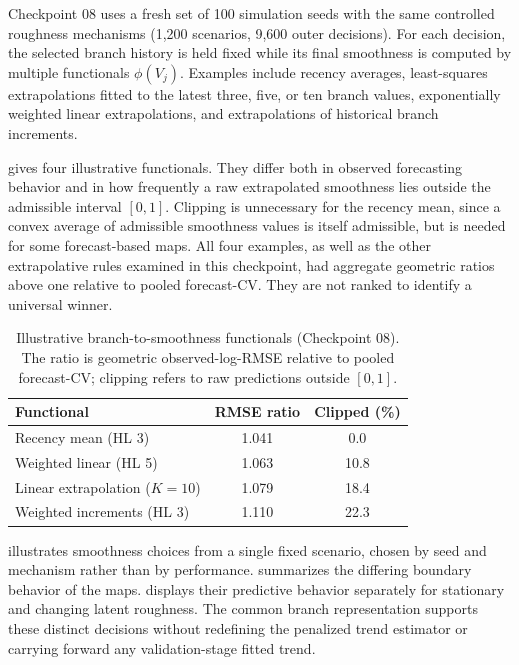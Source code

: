 Checkpoint 08 uses a fresh set of 100 simulation seeds with the same
controlled roughness mechanisms (1,200 scenarios, 9,600 outer decisions).
For each decision, the selected branch history is held fixed while its
final smoothness is computed by multiple functionals $\phi(V_j)$.
Examples include recency averages, least-squares extrapolations fitted
to the latest three, five, or ten branch values, exponentially weighted
linear extrapolations, and extrapolations of historical branch increments.

 gives four illustrative functionals. They differ both
in observed forecasting behavior and in how frequently a raw extrapolated
smoothness lies outside the admissible interval $[0,1]$. Clipping is
unnecessary for the recency mean, since a convex average of admissible
smoothness values is itself admissible, but is needed for some forecast-based
maps. All four examples, as well as the other extrapolative rules examined
in this checkpoint, had aggregate geometric ratios above one relative to
pooled forecast-CV. They are not ranked to identify a universal winner.

\begin{table}[t]
\centering
\caption{Illustrative branch-to-smoothness functionals (Checkpoint 08).
The ratio is geometric observed-log-RMSE relative to pooled
forecast-CV; clipping refers to raw predictions outside $[0,1]$.}
\label{tab:cp08}
\begin{tabular}{@{}lcc@{}}
\toprule
Functional & RMSE ratio & Clipped (\%) \\
\midrule
Recency mean (HL 3) & 1.041 & 0.0 \\
Weighted linear (HL 5) & 1.063 & 10.8 \\
Linear extrapolation ($K=10$) & 1.079 & 18.4 \\
Weighted increments (HL 3) & 1.110 & 22.3 \\
\bottomrule
\end{tabular}
\end{table}

 illustrates smoothness choices from a single
fixed scenario, chosen by seed and mechanism rather than by performance.
 summarizes the differing boundary behavior
of the maps.  displays their predictive behavior
separately for stationary and changing latent roughness. The common branch
representation supports these distinct decisions without redefining the
penalized trend estimator or carrying forward any validation-stage fitted
trend.

